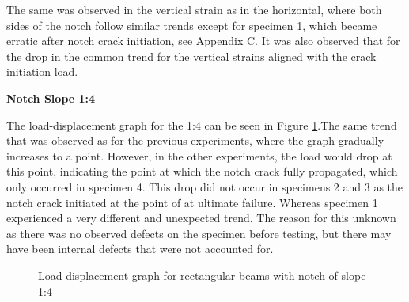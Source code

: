 \documentclass[11pt,a4paper]{article}
\numberwithin{equation}{subsection}
\begin{document}
\noindent
The same was observed in the vertical strain as in the horizontal, where both sides of the notch follow similar trends except for specimen 1, which became erratic after notch crack initiation, see Appendix C. It was also observed that for the drop in the common trend for the vertical strains aligned with the crack initiation load.  

\vspace*{\baselineskip}

\noindent
\textbf{Notch Slope 1:4}\par
\noindent
The load-displacement graph for the 1:4 can be seen in Figure \ref{fig:Rect_14_def}.The same trend that was observed as for the previous experiments, where the graph gradually increases to a point. However, in the other experiments, the load would drop at this point, indicating the point at which the notch crack fully propagated, which only occurred in specimen 4. This drop did not occur in specimens 2 and 3 as the notch crack initiated at the point of at ultimate failure. Whereas specimen 1 experienced a very different and unexpected trend. The reason for this unknown as there was no observed defects on the specimen before testing, but there may have been internal defects that were not accounted for.

\vspace*{\baselineskip}

\begin{figure}[h]
	\begin{center}
	\end{center}
	\caption{Load-displacement graph for rectangular beams with notch of slope 1:4}
	\label{fig:Rect_14_def}
\end{figure}
\end{document}

